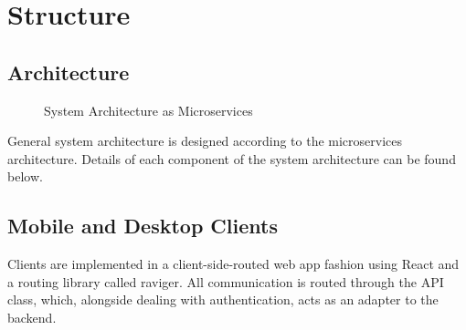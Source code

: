 \section{Structure}

\subsection{Architecture}
\begin{figure}[hb]
    \centering
    \caption{System Architecture as Microservices}
    \label{fig:microservices}
\end{figure}

General system architecture is designed according to the microservices architecture. Details of each component of the system architecture can be found below.

\subsection{Mobile and Desktop Clients}
Clients are implemented in a client-side-routed web app fashion using React and a routing library called raviger. All communication is routed through the API class, which, alongside dealing with authentication, acts as an adapter to the backend.


